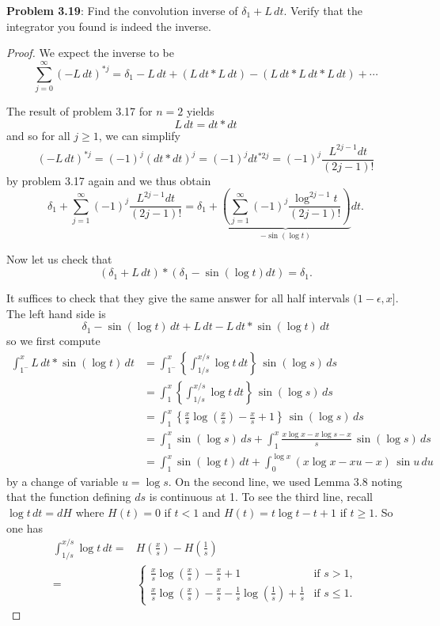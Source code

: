 \documentclass[12pt]{article}
\begin{document}
\textbf{Problem 3.19}: Find the convolution inverse of $\delta_1 + L \, dt$. Verify that the integrator you found is indeed the inverse.

\begin{proof}
We expect the inverse to be
$$\sum_{j = 0}^{\infty} (-L\, dt)^{*j} = \delta_1 - L \, dt + (L\,dt * L\,dt) - (L\,dt * L\,dt * L\,dt) + \cdots$$

The result of problem 3.17 for $n = 2$ yields
$$L \, dt = dt * dt$$
and so for all $j \geq 1$, we can simplify
$$(-L\, dt)^{*j} = (-1)^j (dt * dt)^{j} = (-1)^j dt^{*2j} = (-1)^j \frac{L^{2j - 1} dt}{(2j - 1)!}$$
by problem 3.17 again and we thus obtain
$$\delta_1 + \sum_{j = 1}^{\infty} (-1)^j \frac{L^{2j - 1} dt}{(2j - 1)!} = \delta_1 + \underbrace{\left( \sum_{j = 1}^{\infty} (-1)^j \frac{\log ^{2j - 1} t}{(2j - 1)!} \right)}_{-\sin (\log t)} dt.$$

Now let us check that
$$(\delta_1 + L \, dt) * (\delta_1 - \sin(\log t) dt) = \delta_1.$$

It suffices to check that they give the same answer for all half intervals $(1-\epsilon, x]$. The left hand side is
$$\delta_1 - \sin(\log t) \, dt + L \, dt - L\,dt * \sin(\log t) \, dt$$
so we first compute
\begin{align*}
\int_{1^-}^x L\,dt * \sin(\log t) \, dt &= \int_{1^-}^x \left\{ \int_{1/s}^{x/s} \log t \, dt \right\} \, \sin(\log s) \, ds\\
&= \int_1^x \left\{ \int_{1/s}^{x/s} \log t \, dt \right\} \, \sin(\log s) \, ds\\
&= \int_1^x \left\{ \frac{x}{s} \log \left(\frac{x}{s}\right) - \frac{x}{s} + 1 \right\} \, \sin(\log s) \, ds\\
&= \int_1^x \sin(\log s) \, ds + \int_1^x \frac{x \log x - x \log s - x}{s} \, \sin(\log s) \, ds\\
&= \int_1^x \sin(\log t) \, dt + \int_0^{\log x} (x \log x - x u - x) \, \sin u \, du
\end{align*}
by a change of variable $u = \log s$. On the second line, we used Lemma 3.8 noting that the function defining $ds$ is continuous at 1. To see the third line, recall $\log t \, dt = d H$ where $H(t) = 0$ if $t < 1$ and $H(t) = t \log t - t + 1$ if $t \geq 1$. So one has
\begin{align*}
\int_{1/s}^{x/s} \log t \, dt =& H\left(\frac{x}{s}\right) - H \left(\frac{1}{s}\right)\\
=& \begin{cases}
\frac{x}{s} \log \left(\frac{x}{s}\right) - \frac{x}{s} + 1 &\text{if } s > 1,\\
\frac{x}{s} \log \left(\frac{x}{s}\right) - \frac{x}{s} - \frac{1}{s} \log \left(\frac{1}{s}\right) + \frac{1}{s} &\text{if } s \leq 1.
\end{cases}
\end{align*}


\end{proof}
\end{document}
